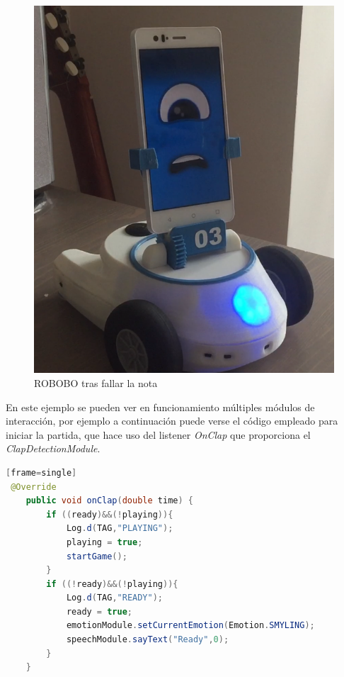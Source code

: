 \begin{figure}[h]
\begin{minipage}{0.45\textwidth}
\end{minipage}\hfill
\begin{minipage}{0.45\textwidth}
\centering
\includegraphics[width=1\linewidth]{imagenes/simon_sad.png}

\caption{ROBOBO tras fallar la nota}
\label{fig:simon-sad}

\end{minipage}
\end{figure}


En este ejemplo se pueden ver en funcionamiento múltiples módulos de interacción, por ejemplo a continuación puede verse el código empleado para iniciar la partida, que hace uso del listener \textit{OnClap} que proporciona el \textit{ClapDetectionModule}.

\vspace{5mm} %

\begin{lstlisting}[language=Java][frame=single]
 @Override
    public void onClap(double time) {
        if ((ready)&&(!playing)){
            Log.d(TAG,"PLAYING");
            playing = true;
            startGame();
        }
        if ((!ready)&&(!playing)){
            Log.d(TAG,"READY");
            ready = true;
            emotionModule.setCurrentEmotion(Emotion.SMYLING);
            speechModule.sayText("Ready",0);
        }
    }

\end{lstlisting}

